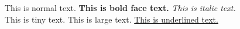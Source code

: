 \documentclass{article}
\begin{document}
This is normal text. 
\newline
\textbf{This is bold face text. }
\textit{This is italic text. }\\
\tiny{This is tiny text. }
\large{This is large text. }
\underline{This is underlined text.}
\end{document}
